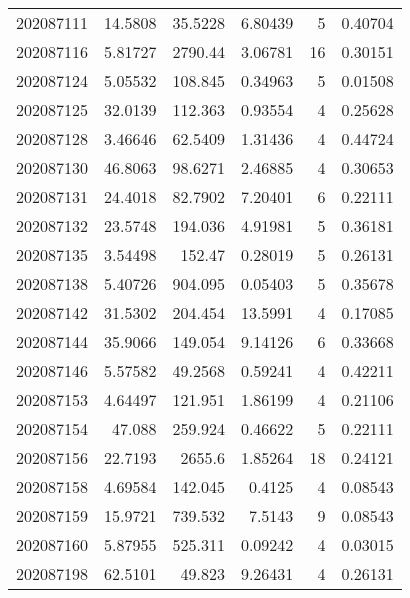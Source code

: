 \begin{tabular}{rrrrrr}
 202087111 &         14.5808  &       35.5228 &            6.80439 &           5 & 0.40704 \\
 202087116 &          5.81727 &     2790.44   &            3.06781 &          16 & 0.30151 \\
 202087124 &          5.05532 &      108.845  &            0.34963 &           5 & 0.01508 \\
 202087125 &         32.0139  &      112.363  &            0.93554 &           4 & 0.25628 \\
 202087128 &          3.46646 &       62.5409 &            1.31436 &           4 & 0.44724 \\
 202087130 &         46.8063  &       98.6271 &            2.46885 &           4 & 0.30653 \\
 202087131 &         24.4018  &       82.7902 &            7.20401 &           6 & 0.22111 \\
 202087132 &         23.5748  &      194.036  &            4.91981 &           5 & 0.36181 \\
 202087135 &          3.54498 &      152.47   &            0.28019 &           5 & 0.26131 \\
 202087138 &          5.40726 &      904.095  &            0.05403 &           5 & 0.35678 \\
 202087142 &         31.5302  &      204.454  &           13.5991  &           4 & 0.17085 \\
 202087144 &         35.9066  &      149.054  &            9.14126 &           6 & 0.33668 \\
 202087146 &          5.57582 &       49.2568 &            0.59241 &           4 & 0.42211 \\
 202087153 &          4.64497 &      121.951  &            1.86199 &           4 & 0.21106 \\
 202087154 &         47.088   &      259.924  &            0.46622 &           5 & 0.22111 \\
 202087156 &         22.7193  &     2655.6    &            1.85264 &          18 & 0.24121 \\
 202087158 &          4.69584 &      142.045  &            0.4125  &           4 & 0.08543 \\
 202087159 &         15.9721  &      739.532  &            7.5143  &           9 & 0.08543 \\
 202087160 &          5.87955 &      525.311  &            0.09242 &           4 & 0.03015 \\
 202087198 &         62.5101  &       49.823  &            9.26431 &           4 & 0.26131 \\

\end{tabular}
